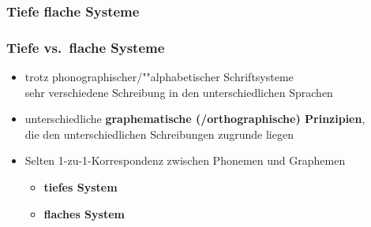 \subsubsection{Tiefe \vs flache Systeme}

\begin{frame}
\frametitle{Tiefe vs.\ flache Systeme}

\begin{itemize}
	\item trotz phonographischer/""alphabetischer Schriftsysteme \ras\\
              sehr verschiedene Schreibung in den unterschiedlichen Sprachen

	\item unterschiedliche \textbf{graphematische (/orthographische) Prinzipien},\\
          die den unterschiedlichen Schreibungen zugrunde liegen

	\item Selten 1-zu-1-Korrespondenz zwischen Phonemen und Graphemen
	
	\begin{itemize}
		\item \textbf{tiefes System}\\ 
		\vs
		\item \textbf{flaches System}
	\end{itemize}
\end{itemize}
\end{frame}


